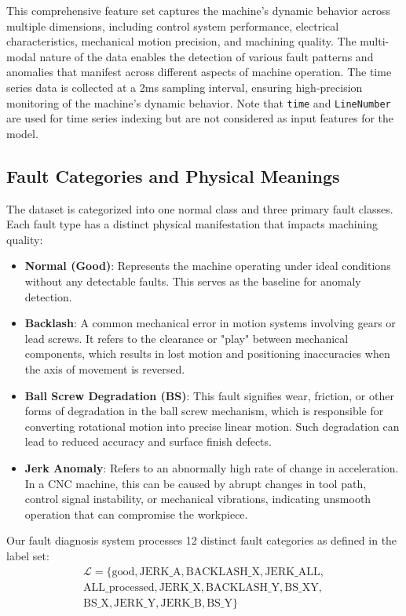 This comprehensive feature set captures the machine's dynamic behavior across multiple dimensions, including control system performance, electrical characteristics, mechanical motion precision, and machining quality. The multi-modal nature of the data enables the detection of various fault patterns and anomalies that manifest across different aspects of machine operation. The time series data is collected at a 2ms sampling interval, ensuring high-precision monitoring of the machine's dynamic behavior. Note that \texttt{time} and \texttt{LineNumber} are used for time series indexing but are not considered as input features for the model.

\subsection{Fault Categories and Physical Meanings}
The dataset is categorized into one normal class and three primary fault classes. Each fault type has a distinct physical manifestation that impacts machining quality:
\begin{itemize}
    \item \textbf{Normal (Good)}: Represents the machine operating under ideal conditions without any detectable faults. This serves as the baseline for anomaly detection.
    \item \textbf{Backlash}: A common mechanical error in motion systems involving gears or lead screws. It refers to the clearance or "play" between mechanical components, which results in lost motion and positioning inaccuracies when the axis of movement is reversed.
    \item \textbf{Ball Screw Degradation (BS)}: This fault signifies wear, friction, or other forms of degradation in the ball screw mechanism, which is responsible for converting rotational motion into precise linear motion. Such degradation can lead to reduced accuracy and surface finish defects.
    \item \textbf{Jerk Anomaly}: Refers to an abnormally high rate of change in acceleration. In a CNC machine, this can be caused by abrupt changes in tool path, control signal instability, or mechanical vibrations, indicating unsmooth operation that can compromise the workpiece.
\end{itemize}

Our fault diagnosis system processes 12 distinct fault categories as defined in the label set:
\begin{align}
\mathcal{L} = \{\text{good}, \text{JERK\_A}, \text{BACKLASH\_X}, \text{JERK\_ALL}, \nonumber \\
\text{ALL\_processed}, \text{JERK\_X}, \text{BACKLASH\_Y}, \text{BS\_XY}, \nonumber \\
\text{BS\_X}, \text{JERK\_Y}, \text{JERK\_B}, \text{BS\_Y}\}
\end{align}

